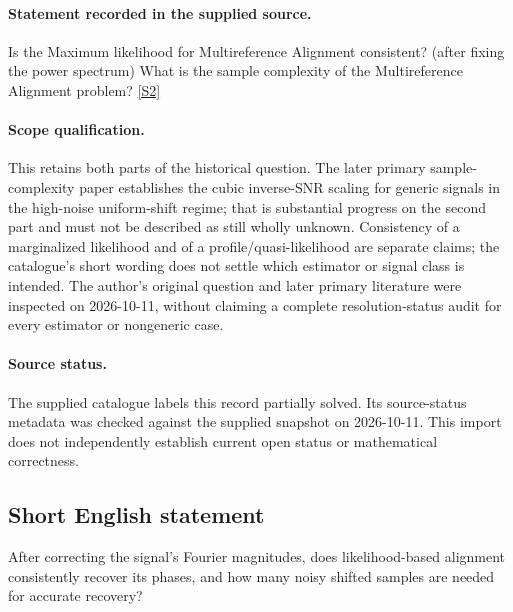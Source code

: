 \documentclass[11pt]{article}
\newcommand{\sref}[2]{\hyperlink{source:#1:#2}{[S#2]}}
\begin{document}
\paragraph{Statement recorded in the supplied source.}
Is the Maximum likelihood for Multireference Alignment consistent? (after fixing the power spectrum) What is the sample complexity of the Multireference Alignment problem? \sref{2801004}{2}
\paragraph{Scope qualification.}
This retains both parts of the historical question. The later primary sample-complexity paper establishes the cubic inverse-SNR scaling for generic signals in the high-noise uniform-shift regime; that is substantial progress on the second part and must not be described as still wholly unknown. Consistency of a marginalized likelihood and of a profile/quasi-likelihood are separate claims; the catalogue's short wording does not settle which estimator or signal class is intended. The author's original question and later primary literature were inspected on 2026-10-11, without claiming a complete resolution-status audit for every estimator or nongeneric case.
\paragraph{Source status.}
The supplied catalogue labels this record partially solved. Its source-status metadata was checked against the supplied snapshot on 2026-10-11. This import does not independently establish current open status or mathematical correctness.
\subsection{Short English statement}
After correcting the signal's Fourier magnitudes, does likelihood-based alignment consistently recover its phases, and how many noisy shifted samples are needed for accurate recovery?
\end{document}
